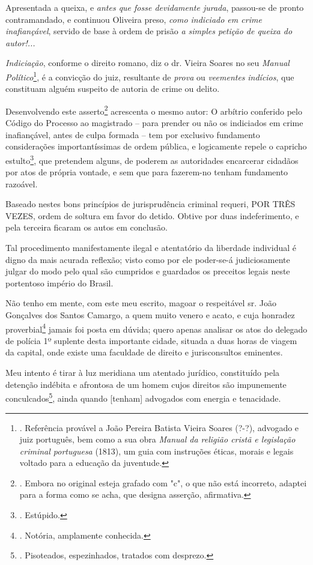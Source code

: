Apresentada a queixa, e \emph{antes que fosse devidamente jurada},
passou-se de pronto contramandado, e continuou Oliveira preso,
\emph{como indiciado em crime inafiançável}, servido de base à ordem de
prisão \emph{a simples petição de queixa do autor!... }

\emph{Indiciação}, conforme o direito romano, diz o dr. Vieira Soares no
seu \emph{Manual Político}\footnote{. Referência provável a João Pereira
  Batista Vieira Soares (?-?), advogado e juiz português, bem como a sua
  obra \emph{Manual da religião cristã e legislação criminal portuguesa}
  (1813), um guia com instruções éticas, morais e legais voltado para a
  educação da juventude.}, é a convicção do juiz, resultante de
\emph{prova} ou \emph{veementes} \emph{indícios}, que constituam alguém
suspeito de autoria de crime ou delito.

Desenvolvendo este asserto\footnote{. Embora no original esteja grafado
  com "c", o que não está incorreto, adaptei para a forma como se acha,
  que designa asserção, afirmativa.} acrescenta o mesmo autor: O
arbítrio conferido pelo Código do Processo ao magistrado -- para prender
ou não os indiciados em crime inafiançável, antes de culpa formada --
tem por exclusivo fundamento considerações importantíssimas de ordem
pública, e logicamente repele o capricho estulto\footnote{. Estúpido.},
que pretendem alguns, de poderem as autoridades encarcerar cidadãos por
atos de própria vontade, e sem que para fazerem-no tenham fundamento
razoável.

Baseado nestes bons princípios de jurisprudência criminal requeri, POR
TRÊS VEZES, ordem de soltura em favor do detido. Obtive por duas
indeferimento, e pela terceira ficaram os autos em conclusão.

Tal procedimento manifestamente ilegal e atentatório da liberdade
individual é digno da mais acurada reflexão; visto como por ele
poder-se-á judiciosamente julgar do modo pelo qual são cumpridos e
guardados os preceitos legais neste portentoso império do Brasil.

Não tenho em mente, com este meu escrito, magoar o respeitável sr. João
Gonçalves dos Santos Camargo, a quem muito venero e acato, e cuja
honradez proverbial\footnote{. Notória, amplamente conhecida.} jamais
foi posta em dúvida; quero apenas analisar os atos do delegado de
polícia 1º suplente desta importante cidade, situada a duas horas de
viagem da capital, onde existe uma faculdade de direito e jurisconsultos
eminentes.

Meu intento é tirar à luz meridiana um atentado jurídico, constituído
pela detenção indébita e afrontosa de um homem cujos direitos são
impunemente conculcados\footnote{. Pisoteados, espezinhados, tratados
  com desprezo.}, ainda quando {[}tenham{]} advogados com energia e
tenacidade.

